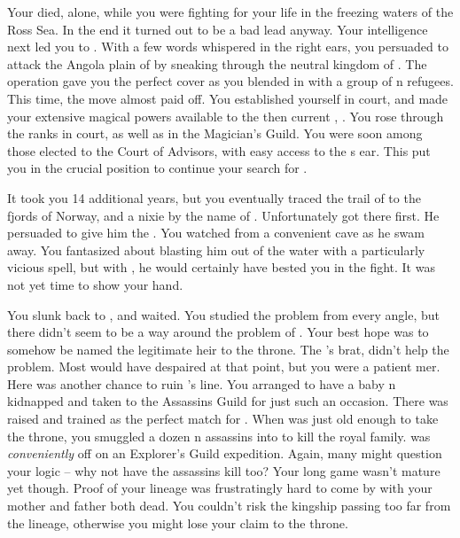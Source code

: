 \documentclass[char]{NeptuneBall}
\begin{document}
Your \cMother{\parent} died, alone, while you were fighting for your life in the freezing waters of the Ross Sea. In the end it turned out to be a bad lead anyway. Your intelligence next led you to \pAtlantis{}. With a few words whispered in the right ears, you persuaded \pPacifica{} to attack the Angola plain of \pAtlantis{} by sneaking through the neutral kingdom of \pIndia{}. The operation gave you the perfect cover as you blended in with a group of \pAtlantis{}n refugees. This time, the move almost paid off. You established yourself in court, and made your extensive magical powers available to the then current \cExKing{\King}, \cExKing{}. You rose through the ranks in court, as well as in the Magician's Guild. You were soon among those elected to the Court of Advisors, with easy access to the \cExKing{\King}s ear. This put you in the crucial position to continue your search for \iTrident{\MYname}.

It took you 14 additional years, but you eventually traced the trail of  \iTrident{\MYname} to the fjords of Norway, and a nixie by the name of \cNixie{}. Unfortunately \cExKing{} got there first. He persuaded \cNixie{} to give him the \iTrident{\MYname}. You watched from a convenient cave as he swam away. You fantasized about blasting him out of the water with a particularly vicious spell, but with \iTrident{\MYname}, he would certainly have bested you in the fight. It was not yet time to show your hand.

You slunk back to \pAtlantis{}, and waited. You studied the problem from every angle, but there didn't seem to be a way around the problem of \iTrident{\MYname}. Your best hope was to somehow be named the legitimate heir to the throne. The \cExKing{\King}'s brat, \cKing{} didn't help the problem. Most would have despaired at that point, but you were a patient mer\cManta{\human}. Here was another chance to ruin \cExExKing{}'s line. You arranged to have a baby \pAtlantis{}n \cQueen{\kid} kidnapped and taken to the Assassins Guild for just such an occasion. There \cQueen{\they} was raised and trained as the perfect match for \cKing{}. When \cKing{} was just old enough to take the throne, you smuggled a dozen \pPacifica{}n assassins into \pAtlantis{} to kill the royal family. \cKing{} was \emph{conveniently} off on an Explorer's Guild expedition. Again, many might question your logic -- why not have the assassins kill \cKing{} too? Your long game wasn't mature yet though. Proof of your lineage was frustratingly hard to come by with your mother and father both dead. You couldn't risk the kingship passing too far from the \cExExKing{} lineage, otherwise you might lose your claim to the throne.
\end{document}
